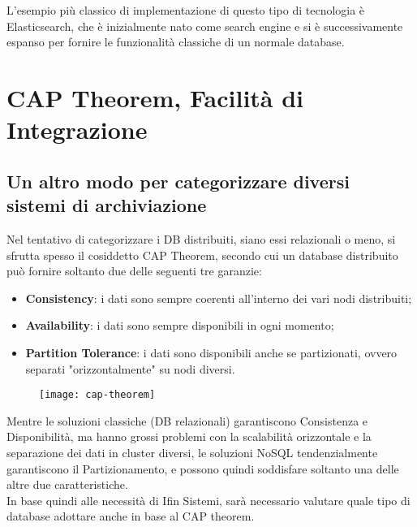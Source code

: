 \noindent L'esempio più classico di implementazione di questo tipo di tecnologia è Elasticsearch, che è inizialmente nato come search engine e si è successivamente espanso per fornire le funzionalità classiche di un normale database.


\section{CAP Theorem, Facilità di Integrazione}
\label{sec:cap-theorem-integrazione}

\subsection{Un altro modo per categorizzare diversi sistemi di archiviazione}
Nel tentativo di categorizzare i DB distribuiti, siano essi relazionali o meno, si sfrutta spesso il cosiddetto CAP Theorem, secondo cui un database distribuito può fornire soltanto due delle seguenti tre garanzie:
\begin{itemize}
    \item \textbf{Consistency}: i dati sono sempre coerenti all'interno dei vari nodi distribuiti;
    \item \textbf{Availability}: i dati sono sempre disponibili in ogni momento;
    \item \textbf{Partition Tolerance}: i dati sono disponibili anche se partizionati, ovvero separati "orizzontalmente" su nodi diversi.
\end{itemize}

\vspace{10pt}
\begin{figure}[htbp]
\begin{center}
\texttt{[image: cap-theorem]}
\end{center}
\end{figure}
\vspace{10pt} 

\noindent Mentre le soluzioni classiche (DB relazionali) garantiscono Consistenza e Disponibilità, ma hanno grossi problemi con la scalabilità orizzontale e la separazione dei dati in cluster diversi, le soluzioni NoSQL tendenzialmente garantiscono il Partizionamento, e possono quindi soddisfare soltanto una delle altre due caratteristiche.\\

\noindent In base quindi alle necessità di Ifin Sistemi, sarà necessario valutare quale tipo di database adottare anche in base al CAP theorem.

